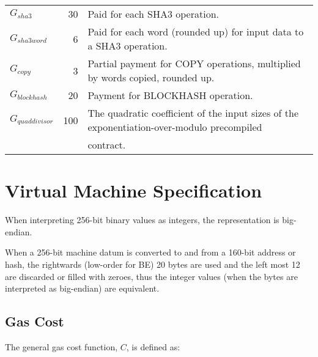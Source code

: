 \documentclass[9pt,oneside]{amsart}
\begin{document}
\begin{tabu}{l r l}
$G_{sha3}$ & 30 & Paid for each {\small SHA3} operation. \\
$G_{sha3word}$ & 6 & Paid for each word (rounded up) for input data to a {\small SHA3} operation. \\
$G_{copy}$ & 3 & Partial payment for {\small *COPY} operations, multiplied by words copied, rounded up. \\
$G_{blockhash}$ & 20 & Payment for {\small BLOCKHASH} operation. \\
$G_{quaddivisor}$ & 100 & The quadratic coefficient of the input sizes of the exponentiation-over-modulo precompiled\\
&&contract. \\ 

\bottomrule
\end{tabu}

\section{Virtual Machine Specification}\label{app:vm}

When interpreting 256-bit binary values as integers, the representation is big-endian.

When a 256-bit machine datum is converted to and from a 160-bit address or hash, the rightwards (low-order for BE) 20 bytes are used and the left most 12 are discarded or filled with zeroes, thus the integer values (when the bytes are interpreted as big-endian) are equivalent.

\subsection{Gas Cost}

The general gas cost function, $C$, is defined as:
\end{document}
